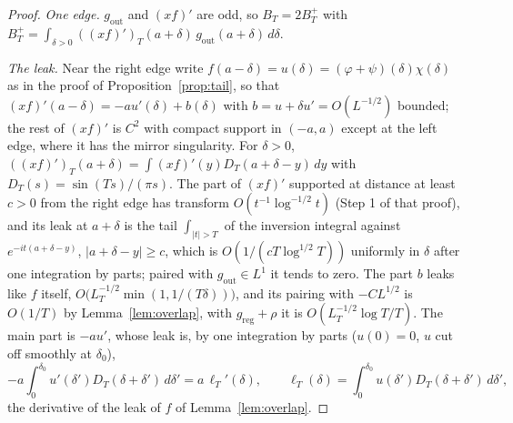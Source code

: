 \documentclass[11pt]{article}
\theoremstyle{definition}
\theoremstyle{remark}
\begin{document}
\begin{proof}
\emph{One edge.} $g_{\mathrm{out}}$ and $(xf)'$ are odd, so $B_T=2B_T^+$ with $B_T^+=\int_{\delta>0}((xf)')_T(a+\delta)\,g_{\mathrm{out}}(a+\delta)\,d\delta$.

\emph{The leak.} Near the right edge write $f(a-\delta)=u(\delta)=(\varphi+\psi)(\delta)\chi(\delta)$ as in the proof of Proposition~\ref{prop:tail}, so that $(xf)'(a-\delta)=-au'(\delta)+b(\delta)$ with $b=u+\delta u'=O(L^{-1/2})$ bounded; the rest of $(xf)'$ is $C^2$ with compact support in $(-a,a)$ except at the left edge, where it has the mirror singularity. For $\delta>0$, $((xf)')_T(a+\delta)=\int(xf)'(y)D_T(a+\delta-y)\,dy$ with $D_T(s)=\sin(Ts)/(\pi s)$. The part of $(xf)'$ supported at distance at least $c>0$ from the right edge has transform $O(t^{-1}\log^{-1/2}t)$ (Step 1 of that proof), and its leak at $a+\delta$ is the tail $\int_{|t|>T}$ of the inversion integral against $e^{-it(a+\delta-y)}$, $|a+\delta-y|\ge c$, which is $O(1/(cT\log^{1/2}T))$ uniformly in $\delta$ after one integration by parts; paired with $g_{\mathrm{out}}\in L^1$ it tends to zero. The part $b$ leaks like $f$ itself, $O\big(L_T^{-1/2}\min(1,1/(T\delta))\big)$, and its pairing with $-CL^{1/2}$ is $O(1/T)$ by Lemma~\ref{lem:overlap}, with $g_{\mathrm{reg}}+\rho$ it is $O(L_T^{-1/2}\log T/T)$. The main part is $-au'$, whose leak is, by one integration by parts ($u(0)=0$, $u$ cut off smoothly at $\delta_0$),
\[
-a\int_0^{\delta_0}u'(\delta')D_T(\delta+\delta')\,d\delta'=a\,\ell_T'(\delta),\qquad \ell_T(\delta)=\int_0^{\delta_0}u(\delta')D_T(\delta+\delta')\,d\delta' ,
\]
the derivative of the leak of $f$ of Lemma~\ref{lem:overlap}.


\end{proof}
\end{document}
